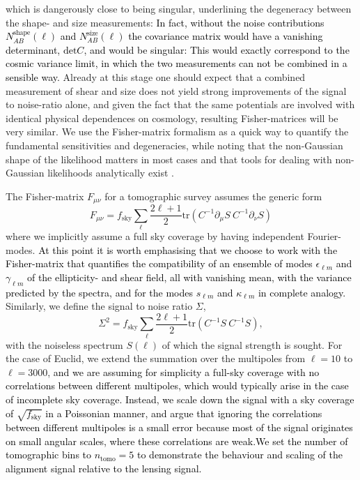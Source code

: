\documentclass[a4paper,fleqn,usenatbib]{mnras}
\newcommand\spirou[1]{\textcolor{black}{#1}}
\begin{document}
which is dangerously close to being singular, underlining the degeneracy between the shape- and size measurements: \spirou{In fact, without the noise contributions $N^\mathrm{shape}_{AB}(\ell)$ and $N^\mathrm{size}_{AB}(\ell)$ the covariance matrix would have a vanishing determinant, $\mathrm{det}C$, and would be singular: This would exactly correspond to the cosmic variance limit, in which the two measurements can not be combined in a sensible way.} Already at this stage one should expect that a combined measurement of shear and size does not yield strong improvements of the signal to noise-ratio alone, and given the fact that the same potentials are involved with identical physical dependences on cosmology, resulting Fisher-matrices will be very similar. We use the Fisher-matrix formalism as a quick way to quantify the fundamental sensitivities and degeneracies, while noting that the non-Gaussian shape of the likelihood matters in most cases and that tools for dealing with non-Gaussian likelihoods analytically exist \citep{takada_impact_2009, sellentin_non-gaussian_2015}.

The Fisher-matrix $F_{\mu\nu}$ for a tomographic survey assumes the generic form
\begin{equation}
F_{\mu\nu} = f_\mathrm{sky}\sum_\ell\frac{2\ell+1}{2}\mathrm{tr}\left(C^{-1}\partial_\mu S\:C^{-1}\partial_\nu S\right)
\end{equation}
where we implicitly assume a full sky coverage by having independent Fourier-modes. \spirou{At this point it is worth emphasising that we choose to work with the Fisher-matrix that quantifies the compatibility of an ensemble of modes $\epsilon_{\ell m}$ and $\gamma_{\ell m}$ of the ellipticity- and shear field, all with vanishing mean, with the variance predicted by the spectra, and for the modes $s_{\ell m}$ and $\kappa_{\ell m}$ in complete analogy.} Similarly, we define the signal to noise ratio $\Sigma$,
\begin{equation}
\Sigma^2 = f_\mathrm{sky}\sum_\ell\frac{2\ell+1}{2}\mathrm{tr}\left(C^{-1}S\:C^{-1}S\right),
\label{eqn_s2n}
\end{equation}
with the noiseless spectrum $S(\ell)$ of which the signal strength is sought. For the case of Euclid, we extend the summation over the multipoles from $\ell=10$ to $\ell=3000$, \spirou{and we are assuming for simplicity a full-sky coverage with no correlations between different multipoles, which would typically arise in the case of incomplete sky coverage. Instead, we scale down the signal with a sky coverage of $\sqrt{f_\mathrm{sky}}$ in a Poissonian manner, and argue that ignoring the correlations between different multipoles is a small error because most of the signal originates on small angular scales, where these correlations are weak.We set the number of tomographic bins to $n_\mathrm{tomo} = 5$ to demonstrate the behaviour and scaling of the alignment signal relative to the lensing signal.}
\end{document}
